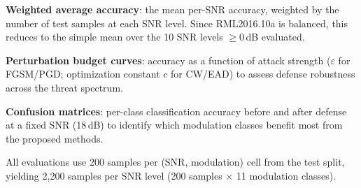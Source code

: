 \textbf{Weighted average accuracy}: the mean per-SNR accuracy, weighted by the
number of test samples at each SNR level.  Since RML2016.10a is balanced, this
reduces to the simple mean over the 10 SNR levels $\geq 0$\,dB evaluated.

\textbf{Perturbation budget curves}: accuracy as a function of attack strength
($\varepsilon$ for FGSM/PGD; optimization constant $c$ for CW/EAD) to assess
defense robustness across the threat spectrum.

\textbf{Confusion matrices}: per-class classification accuracy before and after
defense at a fixed SNR (18\,dB) to identify which modulation classes benefit
most from the proposed methods.

All evaluations use 200 samples per (SNR, modulation) cell from the test split,
yielding 2{,}200 samples per SNR level (200 samples $\times$ 11 modulation classes).
